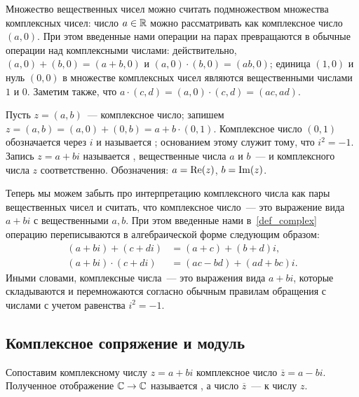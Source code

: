 \begin{remark}
Множество вещественных чисел можно считать
подмножеством множества комплексных чисел: число $a\in\mathbb R$ можно
рассматривать как комплексное число $(a,0)$. При этом введенные нами
операции на парах превращаются в обычные операции над комплексными
числами: действительно, $(a,0)+(b,0)=(a+b,0)$ и $(a,0)\cdot
(b,0)=(ab,0)$; единица $(1,0)$ и нуль $(0,0)$ в множестве комплексных
чисел являются вещественными числами $1$ и $0$. Заметим также, что
$a\cdot (c,d)=(a,0)\cdot (c,d)=(ac,ad)$.
\end{remark}

\begin{definition}
Пусть $z=(a,b)$~--- комплексное число; запишем
$z=(a,b)=(a,0)+(0,b)=a+b\cdot(0,1)$. Комплексное число $(0,1)$
обозначается через $i$ и называется ; основанием
этому служит тому, что $i^2=-1$. Запись
$z=a+bi$ называется ,
вещественные числа $a$ и $b$~---  и
 комплексного числа $z$
соответственно. Обозначения: $a=\operatorname{Re}(z)$, $b=\operatorname{Im}(z)$.
\end{definition}

\begin{remark}
Теперь мы можем забыть про интерпретацию комплексного числа как пары
вещественных чисел и считать, что комплексное число~--- это выражение
вида $a+bi$ с вещественными $a,b$. При этом введенные нами
в~\ref{def_complex} операцию переписываются в алгебраической форме
следующим образом:
\begin{align*}
(a+bi)+(c+di)&=(a+c)+(b+d)i,\\
(a+bi)\cdot (c+di)&=(ac-bd)+(ad+bc)i.
\end{align*}
Иными словами, комплексные числа~--- это выражения вида $a+bi$,
которые складываются и перемножаются согласно обычным правилам
обращения с числами с учетом равенства $i^2=-1$.
\end{remark}

\subsection{Комплексное сопряжение и модуль}


\begin{definition}
Сопоставим комплексному числу $z=a+bi$ комплексное число
$\overline{z}=a-bi$. Полученное отображение $\mathbb C\to\mathbb C$ называется
, а число $\overline{z}$~---  к
числу $z$.
\end{definition}


